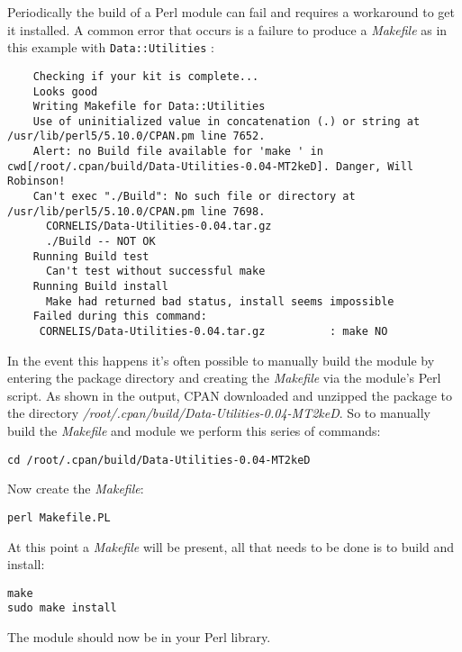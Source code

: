 \documentclass[12pt]{article}
\begin{document}
Periodically the build of a Perl module can fail and requires a workaround to get it installed. A common error that occurs is a failure to produce a {\it Makefile} as in this example with {\tt Data::Utilities} :

\begin{verbatim}
	Checking if your kit is complete...
	Looks good
	Writing Makefile for Data::Utilities
	Use of uninitialized value in concatenation (.) or string at /usr/lib/perl5/5.10.0/CPAN.pm line 7652.
	Alert: no Build file available for 'make ' in cwd[/root/.cpan/build/Data-Utilities-0.04-MT2keD]. Danger, Will Robinson!
	Can't exec "./Build": No such file or directory at /usr/lib/perl5/5.10.0/CPAN.pm line 7698.
	  CORNELIS/Data-Utilities-0.04.tar.gz
	  ./Build -- NOT OK
	Running Build test
	  Can't test without successful make
	Running Build install
	  Make had returned bad status, install seems impossible
	Failed during this command:
	 CORNELIS/Data-Utilities-0.04.tar.gz          : make NO
\end{verbatim} 

In the event this happens it's often possible to manually build the module by entering the package directory and creating the {\it Makefile} via the module's Perl script. As shown in the output, CPAN downloaded and unzipped the package to the directory {\it /root/.cpan/build/Data-Utilities-0.04-MT2keD}. So to manually build the {\it Makefile} and module we perform this series of commands:

\begin{verbatim}
cd /root/.cpan/build/Data-Utilities-0.04-MT2keD
\end{verbatim}

Now create the {\it Makefile}:

\begin{verbatim}
perl Makefile.PL
\end{verbatim}

At this point a {\it Makefile} will be present, all that needs to be done is to build and install:

\begin{verbatim}
make
sudo make install
\end{verbatim}

The module should now be in your Perl library. 
\end{document}
